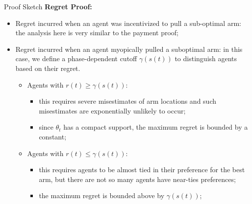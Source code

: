 \documentclass[final]{beamer}
\newlength{\onecolwid}
\begin{document}
\begin{frame}[t]
\begin{columns}[t]
\begin{column}{\onecolwid}
\begin{block}{Proof Sketch}
\textbf{Regret Proof:}
\begin{itemize}
\item Regret incurred when an agent was incentivized to pull a sub-optimal arm: the analysis here is very similar to the payment proof;
\vspace{0.5cm}
\item Regret incurred when an agent myopically pulled a suboptimal arm: in this case, we define a phase-dependent cutoff $\gamma(s(t))$ to distinguish agents based on their regret.
\vspace{0.3cm}
\begin{itemize}
\item Agents with $r(t)\geq \gamma(s(t))$:
\begin{itemize}
\item this requires severe misestimates of arm locations and such misestimates are exponentially unlikely to occur;
\vspace{0.1cm}
\item since $\theta_t$ has a compact support, the maximum regret is bounded by a constant;
\end{itemize}
\vspace{0.3cm}
\item Agents with $r(t)\leq \gamma(s(t))$: 
\begin{itemize}
\item this requires agents to be almost tied in their preference for the best arm, but there are not so many agents have near-ties preferences;
\vspace{0.1cm}
\item the maximum regret is bounded above by $\gamma(s(t))$;
\end{itemize}
\end{itemize}
\end{itemize}
\vspace{1cm}



\end{block}
\end{column}
\end{columns}
\end{frame}
\end{document}
